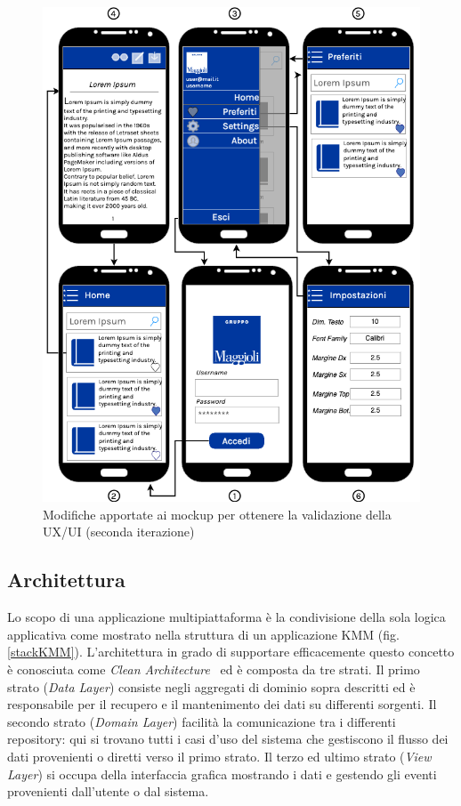 \begin{figure}[H]
    \centering
    \includegraphics[width=1\textwidth]{img/mockup-uiux-2.png}
    \caption{Modifiche apportate ai mockup per ottenere la validazione della UX/UI (seconda iterazione)}
\end{figure}

\subsection{Architettura}
Lo scopo di una applicazione multipiattaforma è la condivisione della sola logica applicativa come mostrato nella struttura di un applicazione KMM (fig. \ref{stackKMM}). L'architettura in grado di supportare efficacemente questo concetto è conosciuta come \textit{Clean Architecture}~\cite{martin2017architecture} ed è composta da tre strati. Il primo strato (\textit{Data Layer}) consiste negli aggregati di dominio sopra descritti ed è responsabile per il recupero e il mantenimento dei dati su differenti sorgenti. Il secondo strato (\textit{Domain Layer}) facilità la comunicazione tra i differenti repository: qui si trovano tutti i casi d'uso del sistema che gestiscono il flusso dei dati provenienti o diretti verso il primo strato. Il terzo ed ultimo strato (\textit{View Layer}) si occupa della interfaccia grafica mostrando i dati e gestendo gli eventi provenienti dall'utente o dal sistema.

